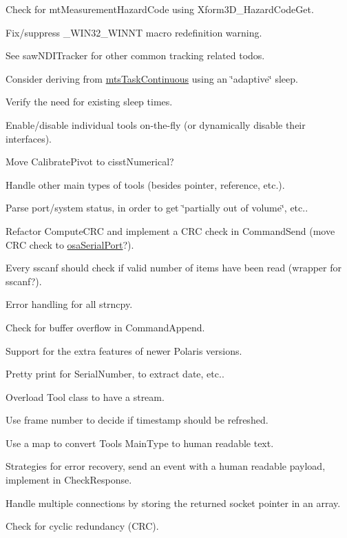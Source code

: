 \begin{DoxyRefList}
Check for mt\+Measurement\+Hazard\+Code using Xform3\+D\+\_\+\+Hazard\+Code\+Get. 

Fix/suppress \+\_\+\+W\+I\+N32\+\_\+\+W\+I\+N\+N\+T macro redefinition warning. 

See saw\+N\+D\+I\+Tracker for other common tracking related todos.  
\item[\label{todo__todo000016}%
\hypertarget{todo__todo000016}{}%
File \hyperlink{mts_n_d_i_serial_8h}{mts\+N\+D\+I\+Serial.h} ]Consider deriving from \hyperlink{classmts_task_continuous}{mts\+Task\+Continuous} using an \char`\"{}adaptive\char`\"{} sleep. 

Verify the need for existing sleep times. 

Enable/disable individual tools on-\/the-\/fly (or dynamically disable their interfaces). 

Move Calibrate\+Pivot to cisst\+Numerical? 

Handle other main types of tools (besides pointer, reference, etc.). 

Parse port/system status, in order to get \char`\"{}partially out of volume\char`\"{}, etc.. 

Refactor Compute\+C\+R\+C and implement a C\+R\+C check in Command\+Send (move C\+R\+C check to \hyperlink{classosa_serial_port}{osa\+Serial\+Port}?). 

Every sscanf should check if valid number of items have been read (wrapper for sscanf?). 

Error handling for all strncpy. 

Check for buffer overflow in Command\+Append. 

Support for the extra features of newer Polaris versions. 

Pretty print for Serial\+Number, to extract date, etc.. 

Overload Tool class to have a stream. 

Use frame number to decide if timestamp should be refreshed. 

Use a map to convert Tool\textquotesingle{}s Main\+Type to human readable text. 

Strategies for error recovery, send an event with a human readable payload, implement in Check\+Response.  
\item[\label{todo__todo000017}%
\hypertarget{todo__todo000017}{}%
File \hyperlink{mts_open_i_g_t_link_8h}{mts\+Open\+I\+G\+T\+Link.h} ]Handle multiple connections by storing the returned socket pointer in an array. 

Check for cyclic redundancy (C\+R\+C). 


\end{DoxyRefList}
